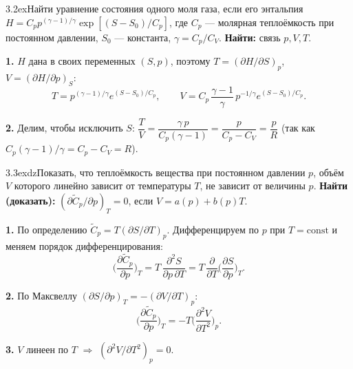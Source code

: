 \begin{problem}{3.2}{ex}{Найти уравнение состояния одного моля газа, если его энтальпия $H=C_pp^{(\gamma-1)/\gamma}\exp[(S-S_0)/C_p]$, где
$C_p$ — молярная теплоёмкость при постоянном давлении, $S_0$ — константа, $\gamma=C_p/C_V$.}
\textbf{Найти:} связь $p,V,T$.

\textbf{1.} $H$ дана в своих переменных $(S,p)$, поэтому $T=(\partial H/\partial S)_p$, $V=(\partial H/\partial p)_S$:
\[T=p^{(\gamma-1)/\gamma}e^{(S-S_0)/C_p},\qquad
V=C_p\,\frac{\gamma-1}{\gamma}\,p^{-1/\gamma}e^{(S-S_0)/C_p}.\]

\textbf{2.} Делим, чтобы исключить $S$: $\dfrac TV=\dfrac{\gamma\,p}{C_p(\gamma-1)}=\dfrac{p}{C_p-C_V}=\dfrac pR$
(так как $C_p(\gamma-1)/\gamma=C_p-C_V=R$).
\end{problem}

\begin{problem}{3.3}{exdz}{Показать, что теплоёмкость вещества при постоянном давлении $p$, объём $V$ которого линейно зависит от температуры
$T$, не зависит от величины $p$.}
\textbf{Найти (доказать):} $(\partial\widetilde C_p/\partial p)_T=0$, если $V=a(p)+b(p)T$.

\textbf{1.} По определению $\widetilde C_p=T(\partial S/\partial T)_p$. Дифференцируем по $p$ при $T=\mathrm{const}$ и меняем порядок дифференцирования:
\[\Big(\frac{\partial\widetilde C_p}{\partial p}\Big)_T=T\,\frac{\partial^2S}{\partial p\,\partial T}
=T\,\frac{\partial}{\partial T}\Big(\frac{\partial S}{\partial p}\Big)_T.\]

\textbf{2.} По Максвеллу $(\partial S/\partial p)_T=-(\partial V/\partial T)_p$:
\[\Big(\frac{\partial\widetilde C_p}{\partial p}\Big)_T=-T\Big(\frac{\partial^2V}{\partial T^2}\Big)_p.\]

\textbf{3.} $V$ линеен по $T$ $\Rightarrow$ $(\partial^2V/\partial T^2)_p=0$.
\end{problem}

